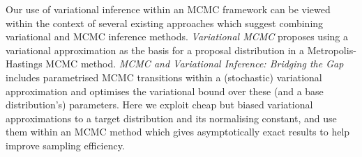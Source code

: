 Our use of variational inference  within an \ac{MCMC} framework can be viewed within the context of several existing approaches which suggest combining variational and \ac{MCMC} inference methods. \emph{Variational MCMC} \citep{de2001variational} proposes using a variational approximation as the basis for a proposal distribution in a Metropolis-Hastings \ac{MCMC} method. \emph{MCMC and Variational Inference: Bridging the Gap} \citep{salimans2015markov} includes parametrised \ac{MCMC} transitions within a (stochastic) variational approximation and optimises the variational bound over these (and a base distribution's) parameters. Here we exploit cheap but biased variational approximations to a target distribution and its normalising constant, and use them within an \ac{MCMC} method which gives asymptotically exact results to help improve sampling efficiency.